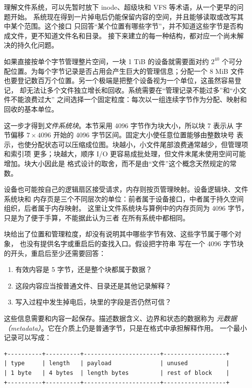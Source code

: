 
理解文件系统，可以先暂时放下 inode、超级块和 VFS 等术语，从一个更早的问题开始。
系统现在得到一片掉电后仍能保留内容的空间，并且能够读取或改写其中某个范围。这个接口
只回答“某个位置有哪些字节”，并不知道这些字节是否构成文件，更不知道文件名和目录。
接下来建立的每一种结构，都对应一个尚未解决的持久化问题。

如果直接按单个字节管理整片空间，一块 1 TiB 的设备就需要面对约
$2^{40}$ 个可分配位置。为每个字节记录是否占用会产生巨大的管理信息；分配一个
8 MiB 文件也要登记数百万个位置。另一个极端是把整个设备视为一个单位，这虽然容易登记，
却无法让多个文件独立增长和回收。系统需要在“管理记录不能过多”和“小文件不能浪费过大”
之间选择一个固定粒度：每次以一组连续字节作为分配、映射和回收的基本单位。

这一步才得到\emph{文件系统块}。本节采用 4096 字节作为块大小，所以块 7 表示从
字节偏移 $7\times4096$ 开始的 4096 字节区间。固定大小使任意位置能够由整数块号
表示，也使分配状态可以压缩成位图。块越小，小文件尾部浪费通常越少，但管理项和索引项
更多；块越大，顺序 I/O 更容易成批处理，但文件末尾未使用空间可能增加。块大小因此是
格式设计的取舍，而不是由“文件”这个概念天然规定的常数。

设备也可能按自己的逻辑扇区接受请求，内存则按页管理映射。设备逻辑块、文件系统块和
内存页是三个不同层次的单位：前者属于设备接口，中者属于持久空间组织，后者属于内存映射。
这里让文件系统块与算例中的内存页同为 4096 字节，只是为了便于手算，不能据此认为三者
在所有系统中都相同。


块给出了位置和管理粒度，却没有说明其中哪些字节有效、这些字节属于哪个对象，
也没有提供名字或重启后的查找入口。假设把字符串  写在一个
4096 字节块的开头，重启后至少还需要回答：

\begin{enumerate}\tightlist
\item 有效内容是 5 字节，还是整个块都属于数据？
\item 这段内容应当按普通文件、目录还是其他记录解释？
\item 写入过程中发生掉电后，块里的字段是否仍然可信？
\end{enumerate}

这些信息需要和内容一起保存。描述数据含义、边界和状态的数据称为
\emph{元数据（metadata）}。它在介质上仍是普通字节，只是在格式中承担解释作用。
一个最小记录可以写成：

\begin{lstlisting}
+----------+----------+----------------------+------------------+
| type     | length   | payload              | unused           |
| 1 byte   | 4 bytes  | length bytes         | rest of block    |
+----------+----------+----------------------+------------------+
\end{lstlisting}

